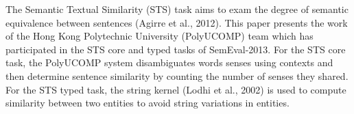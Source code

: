 The Semantic Textual Similarity (STS) task aims to exam the degree of semantic equivalence between sentences (Agirre et al., 2012). This paper presents the
 work of the Hong Kong Polytechnic University (PolyUCOMP) team which has
 participated in the STS core and typed tasks of SemEval-2013. For the STS core
 task, the PolyUCOMP system disambiguates words senses using contexts and then
 determine sentence similarity by counting the number of senses they shared. For
 the STS typed task, the string kernel (Lodhi et al., 2002) is used to compute
 similarity between two entities to avoid string variations in entities.

